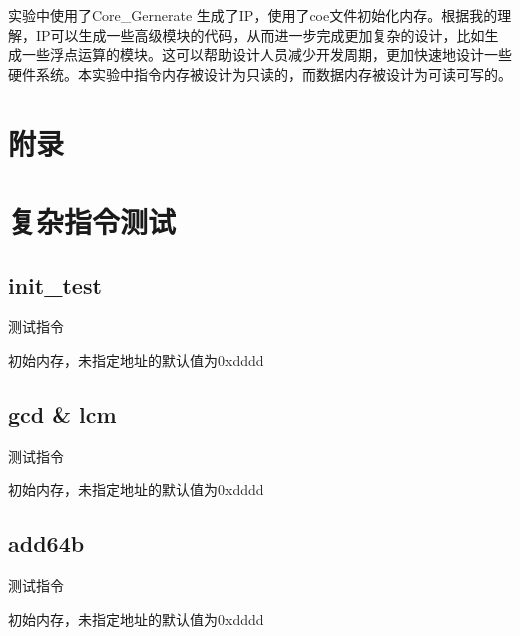 \documentclass[10pt,a4paper,fleqn]{article}
\newcommand{\song}{\CJKfamily{song}}
\begin{document}
   \par 实验中使用了Core\_Gernerate 生成了IP，使用了coe文件初始化内存。根据我的理解，IP可以生成一些高级模块的代码，从而进一步完成更加复杂的设计，比如生成一些浮点运算的模块。这可以帮助设计人员减少开发周期，更加快速地设计一些硬件系统。本实验中指令内存被设计为只读的，而数据内存被设计为可读可写的。
  \appendix
  \titleformat{\section}{\bf\song}{\thesection}{1em}{}
  \newpage
\section*{附录}
\section{复杂指令测试}
\subsection{init\_test}
{
\setlength{\columnsep}{5em}
\begin{multicols}{2}
\par 测试指令

\par 初始内存，未指定地址的默认值为0xdddd

\end{multicols}
}
\subsection{gcd \& lcm}
{
\setlength{\columnsep}{5em}
\begin{multicols}{2}
\par 测试指令

\par 初始内存，未指定地址的默认值为0xdddd

\end{multicols}
}
\subsection{add64b}
{
\setlength{\columnsep}{5em}
\begin{multicols}{2}
\par 测试指令

\par 初始内存，未指定地址的默认值为0xdddd

\end{multicols}
}
\end{document}
